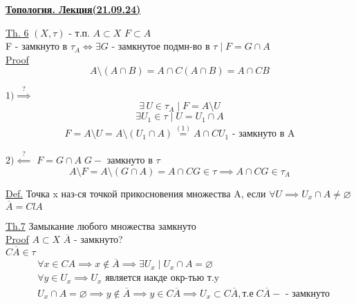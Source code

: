 \documentclass[a4paper]{article}
\begin{document}
\begin{center}
    \textbf{ \underline{Топология. Лекция(21.09.24)}}
\end{center}

\begin{tcolorbox}
\underline{Th. 6} $ (X, \tau) $ - т.п. $ A \subset X $ $ F \subset A $ \\
F - замкнуто в $ \tau_A \iff \exists G \text{ - замкнутое подмн-во в } \tau \; |
\; F  = G \cap A$ \\
\underline{Proof} \\
\begin{equation}
    A \setminus ( A \cap B) = A \cap C(A \cap B) = A \cap CB
\end{equation}

$1) \stackrel{?}{\implies}$ 
\[
    \exists\, U \in \tau_A \; | \; F = A \setminus U
\]
\[
    \exists U_1 \in \tau \; | \; U = U_1 \cap A
\]
\begin{equation*}
    \begin{aligned}
        F = A \setminus U = A \setminus (U_1 \cap A) \stackrel{(1)}{=} A \cap
        CU_1 \text{ - замкнуто в A}
    \end{aligned}
\end{equation*}

$2) \stackrel{?}{\impliedby}$ $ F = G \cap A \; G -\text{ замкнуто в } \tau $  
\[
    A \setminus F = A \setminus (G \cap A) = A \cap CG \in \tau \implies
    A \cap CG \in \tau_A
\]
\end{tcolorbox} 

\underline{Def.} Точка x наз-ся точкой прикосновения множества A, если $ 
\forall U \implies U_x \cap A \neq \varnothing $ \\
$ \overline{A} = ClA $ 

\begin{tcolorbox}
    \underline{Th.7} Замыкание любого множества замкнуто \\

    \underline{Proof} $ A \subset X $ $ \overline{A} $ - замкнуто?\\
    $ C \overline{A} \in \tau $ \\
    \begin{equation*}
        \begin{aligned}
            &\forall x \in CA \implies x \notin \overline{A} \implies \exists U_x \;
            | \; U_x \cap A = \varnothing \\
            &\forall y \in U_x \implies U_x \text{ является иакде окр-тью т.y}\\
            &U_x \cap A = \varnothing \implies y \notin \overline{A} \implies
            y \in C \overline{A} \implies U_x \subset C \overline{A}, \text{т.е} \;
            C \overline{A} - \text{ - замкнуто}
        \end{aligned}
    \end{equation*}
\end{tcolorbox}
\end{document}
